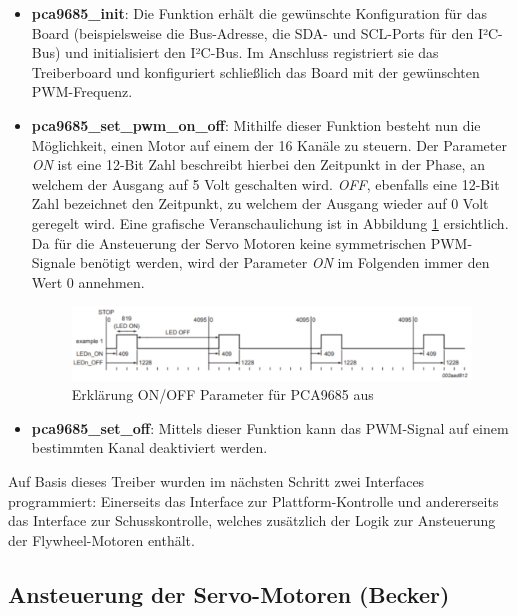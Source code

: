 \begin{itemize}
    \item \textbf{pca9685\_init}: Die Funktion erhält die gewünschte Konfiguration für das Board (beispielsweise die Bus-Adresse, die SDA- und SCL-Ports für den I²C-Bus) und initialisiert den I²C-Bus. 
    Im Anschluss registriert sie das Treiberboard und konfiguriert schließlich das Board mit der gewünschten PWM-Frequenz.
    \item \textbf{pca9685\_set\_pwm\_on\_off}: Mithilfe dieser Funktion besteht nun die Möglichkeit, einen Motor auf einem der 16 Kanäle zu steuern. 
    Der Parameter \textit{ON} ist eine 12-Bit Zahl beschreibt hierbei den Zeitpunkt in der Phase, an welchem der Ausgang auf 5 Volt geschalten wird. 
    \textit{OFF}, ebenfalls eine 12-Bit Zahl bezeichnet den Zeitpunkt, zu welchem der Ausgang wieder auf 0 Volt geregelt wird. 
    Eine grafische Veranschaulichung ist in Abbildung \ref{fig:esp_pca9685_on_off} ersichtlich. 
    Da für die Ansteuerung der Servo Motoren keine symmetrischen PWM-Signale benötigt werden, wird der Parameter \textit{ON} im Folgenden immer den Wert 0 annehmen.

    \begin{figure}[ht]
        \centering
        \includegraphics[width=\textwidth]{images/becker_esp_pca9685.png}
        \caption{Erklärung ON\slash OFF Parameter für PCA9685 aus \cite[S.~17]{esp_pca9685_datasheet}}
        \label{fig:esp_pca9685_on_off}
    \end{figure}

    \item \textbf{pca9685\_set\_off}: Mittels dieser Funktion kann das PWM-Signal auf einem bestimmten Kanal deaktiviert werden.
\end{itemize}

Auf Basis dieses Treiber wurden im nächsten Schritt zwei Interfaces programmiert: 
Einerseits das Interface zur Plattform-Kontrolle und andererseits das Interface zur Schusskontrolle, welches zusätzlich der Logik zur Ansteuerung der Flywheel-Motoren enthält.

\subsection{Ansteuerung der Servo-Motoren (Becker)}

